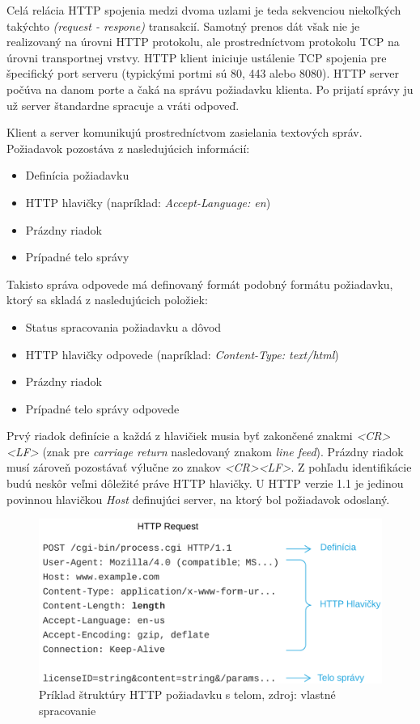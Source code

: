 \documentclass[
  digital, %
  table,   %
  lof,     %
  nolot,   %
  nocover
]{fithesis3}
\begin{document}
Celá relácia HTTP spojenia medzi dvoma uzlami je teda sekvenciou niekoľkých
takýchto \textit{(request - respone)} transakcií. Samotný prenos dát však nie
je realizovaný na úrovni HTTP protokolu, ale prostredníctvom protokolu TCP
na úrovni transportnej vrstvy. HTTP klient iniciuje ustálenie TCP spojenia pre
špecifický port serveru (typickými portmi sú 80, 443 alebo 8080). HTTP server
počúva na danom porte a čaká na správu požiadavku klienta. Po prijatí správy ju
už server štandardne spracuje a vráti odpoveď. 

Klient a server komunikujú prostredníctvom zasielania textových správ.
Požiadavok pozostáva z nasledujúcich informácií: 
\begin{itemize}
	\item Definícia požiadavku
	\item HTTP hlavičky (napríklad: \textit{Accept-Language: en})
	\item Prázdny riadok
	\item Prípadné telo správy
\end{itemize}

Takisto správa odpovede má definovaný formát podobný formátu požiadavku, ktorý
sa skladá z nasledujúcich položiek:
\begin{itemize}
	\item Status spracovania požiadavku a dôvod
	\item HTTP hlavičky odpovede (napríklad: \textit{Content-Type: text/html})
	\item Prázdny riadok
	\item Prípadné telo správy odpovede
\end{itemize}

Prvý riadok definície a každá z hlavičiek musia byť zakončené znakmi
\textit{<CR><LF>}
(znak pre \textit{carriage return} nasledovaný znakom \textit{line feed}).
Prázdny riadok musí zároveň pozostávať výlučne zo znakov \textit{<CR><LF>}.
Z pohľadu identifikácie budú neskôr veľmi dôležité práve HTTP hlavičky. U HTTP
verzie 1.1 je jedinou povinnou hlavičkou \textit{Host} definujúci server, na
ktorý bol požiadavok odoslaný.

\begin{figure}[h]
  \centering
    \includegraphics[width=.97\textwidth]{images/net-http.png}
  \caption{Príklad štruktúry HTTP požiadavku s telom, zdroj: vlastné spracovanie}
  \label{fig:net-http}
\end{figure}
\end{document}
